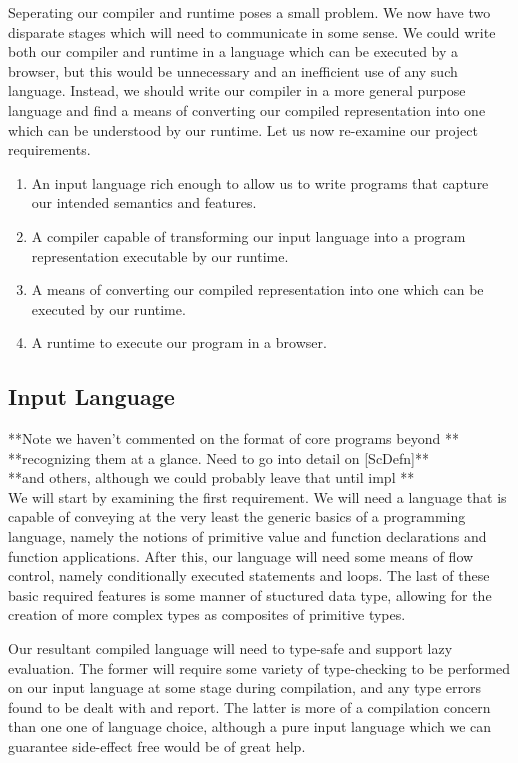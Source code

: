 \documentclass[11pt]{article}
\begin{document}
Seperating our compiler and runtime poses a small problem. We now have two disparate
stages which will need to communicate in some sense. We could write both our compiler
and runtime in a language which can be executed by a browser, but this would be 
unnecessary and an inefficient use of any such language. Instead, we should write our
compiler in a more general purpose language and find a means of converting our compiled
representation into one which can be understood by our runtime. Let us now re-examine
our project requirements.

\begin{enumerate}
	\item An input language rich enough to allow us to write programs
		  that capture our intended semantics and features.
	\item A compiler capable of transforming our input language into
		  a program representation executable by our runtime.
	\item A means of converting our compiled representation into one
		  which can be executed by our runtime.
	\item A runtime to execute our program in a browser. 
\end{enumerate}

\subsection{Input Language}

**Note we haven't commented on the format of core programs beyond **\\
**recognizing them at a glance. Need to go into detail on [ScDefn]**\\
**and others, although we could probably leave that until impl	  **\\

\noindent We will start by examining the first requirement. We will need a
language that is capable of conveying at the very least the generic basics of a programming language, namely the notions of primitive value and function
declarations and function applications. After this, our language will need
some means of flow control, namely conditionally executed statements and 
loops. The last of these basic required features is some manner of stuctured
data type, allowing for the creation of more complex types as composites of
primitive types. 

Our resultant compiled language will need to type-safe and support lazy
evaluation. The former will require some variety of type-checking to be 
performed on our input language at some stage during compilation, and any
type errors found to be dealt with and report. The latter is more of a 
compilation concern than one one of language choice, although a pure input
language which we can guarantee side-effect free would be of great help.
\end{document}
